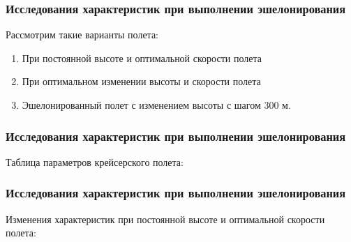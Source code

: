 \documentclass{beamer}
\begin{document}
\begin{frame}[t]
    \frametitle{Исследования характеристик при выполнении эшелонирования}
\begin{center}
    \begin{minipage}{0.9\textwidth}
        \begin{block}{Рассмотрим такие варианты полета:}
            \begin{enumerate}
                \item При постоянной высоте и оптимальной скорости полета 
                \item При оптимальном изменении высоты и скорости полета
                \item Эшелонированный полет с изменением высоты с шагом 300 м.
            \end{enumerate}
        \end{block}
    \end{minipage}
\end{center}

\end{frame}

\begin{frame}[t]
    \frametitle{Исследования характеристик при выполнении эшелонирования}
\begin{center}
    \vspace{-0.5cm}
    Таблица параметров крейсерского полета:
    \begin{minipage}{\textwidth}
        \begin{table}[H]
            \centering
            \resizebox{0.55\textwidth}{!}{}
        \end{table}
    \end{minipage}
\end{center}
\end{frame}

\begin{frame}[t]
    \frametitle{Исследования характеристик при выполнении эшелонирования}
    \begin{center}
        Изменения характеристик при постоянной высоте и оптимальной скорости полета:

        \begin{minipage}{0.49\textwidth}
            \centering
            \resizebox{1.0\textwidth}{!}{}
        \end{minipage}
        \hfill
        \begin{minipage}{0.49\textwidth}
            \centering
            \resizebox{1.0\textwidth}{!}{}
        \end{minipage}
    \end{center}
\end{frame}
\end{document}
